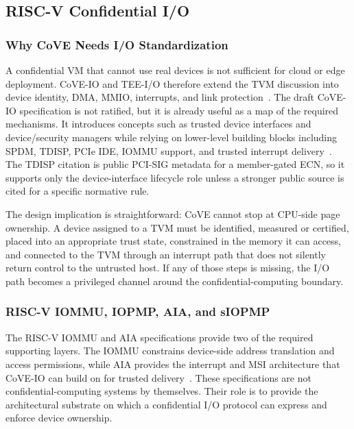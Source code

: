 \subsection{RISC-V Confidential I/O}

\subsubsection{Why CoVE Needs I/O Standardization}

A confidential VM that cannot use real devices is not sufficient for cloud or
edge deployment. CoVE-IO and TEE-I/O therefore extend the TVM discussion into
device identity, DMA, MMIO, interrupts, and link protection~\cite{riscv_cove_io_2026}. The
draft CoVE-IO specification is not ratified, but it is already useful as a map
of the required mechanisms. It introduces concepts such as trusted device
interfaces and device/security managers while relying on lower-level building
blocks including SPDM, TDISP, PCIe IDE, IOMMU support, and trusted interrupt
delivery~\cite{riscv_cove_io_2026,dmtf_spdm_2025,pcisig_tdisp_2022,pcie_ide}.
The TDISP citation is public PCI-SIG metadata for a member-gated ECN, so it
supports only the device-interface lifecycle role unless a stronger public
source is cited for a specific normative rule.

The design implication is straightforward: CoVE cannot stop at CPU-side page
ownership. A device assigned to a TVM must be identified, measured or certified,
placed into an appropriate trust state, constrained in the memory it can access,
and connected to the TVM through an interrupt path that does not silently return
control to the untrusted host. If any of those steps is missing, the I/O path
becomes a privileged channel around the confidential-computing boundary.

\subsubsection{RISC-V IOMMU, IOPMP, AIA, and sIOPMP}

The RISC-V IOMMU and AIA specifications provide two of the required supporting
layers. The IOMMU constrains device-side address translation and access
permissions, while AIA provides the interrupt and MSI architecture that CoVE-IO
can build on for trusted delivery~\cite{riscv_iommu_2023,riscv_aia_2023}. These
specifications are not confidential-computing systems by themselves. Their role
is to provide the architectural substrate on which a confidential I/O protocol
can express and enforce device ownership.

